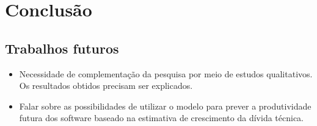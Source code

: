 \chapter{Conclusão}



\section{Trabalhos futuros}

\begin{itemize}
\item Necessidade de complementação da pesquisa por meio de estudos qualitativos. Os resultados obtidos precisam ser explicados.
\item Falar sobre as possibilidades de utilizar o modelo para prever a produtividade futura dos software baseado na estimativa de crescimento da dívida técnica.
\end{itemize}